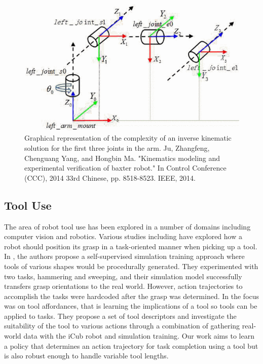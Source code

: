 \documentclass[conference]{IEEEtran}
\begin{document}
\begin{figure}[h!]
\centering
 \includegraphics[scale=0.4]{joints.png}
 \caption{Graphical representation of the complexity of an inverse kinematic solution for the first three joints in the arm. Ju, Zhangfeng, Chenguang Yang, and Hongbin Ma. "Kinematics modeling and experimental verification of baxter robot." In Control Conference (CCC), 2014 33rd Chinese, pp. 8518-8523. IEEE, 2014.}
 \label{fig:ik}
\end{figure} 

\subsection{Tool Use}
The area of robot tool use has been explored in a number of domains including computer vision and robotics. Various studies including \cite{b2} have explored how a robot should position its grasp in a task-oriented manner when picking up a tool. In \cite{b2}, the authors propose a self-supervised simulation training approach where tools of various shapes would be procedurally generated. They experimented with two tasks, hammering and sweeping, and their simulation model successfully transfers grasp orientations to the real world. However, action trajectories to accomplish the tasks were hardcoded after the grasp was determined. In \cite{b3} the focus was on tool affordances, that is learning the implications of a tool so tools can be applied to tasks. They propose a set of tool descriptors and investigate the suitability of the tool to various actions through a combination of gathering real-world data with the iCub robot and simulation training. Our work aims to learn a policy that determines an action trajectory for task completion using a tool but is also robust enough to handle variable tool lengths. 
\end{document}
